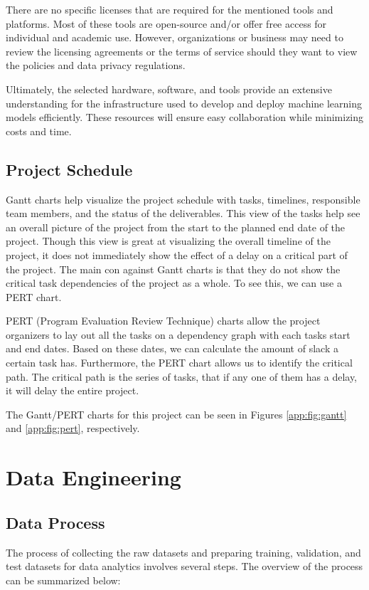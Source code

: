 \documentclass[stu,12pt,floatsintext]{apa7}
\let\oldsection\section
\renewcommand{\section}{\newpage\oldsection}
\begin{document}
There are no specific licenses that are required for the mentioned tools and platforms. Most of these tools are open-source and/or offer free access for individual and academic use. However, organizations or business may need to review the licensing agreements or the terms of service should they want to view the policies and data privacy regulations. 

Ultimately, the selected hardware, software, and tools provide an extensive understanding for the infrastructure used to develop and deploy machine learning models efficiently. These resources will ensure easy collaboration while minimizing costs and time. 

\subsection{Project Schedule}
Gantt charts help visualize the project schedule with tasks, timelines, responsible team members, and the status of the deliverables. This view of the tasks help see an overall picture of the project from the start to the planned end date of the project. Though this view is great at visualizing the overall timeline of the project, it does not immediately show the effect of a delay on a critical part of the project. The main con against Gantt charts is that they do not show the critical task dependencies of the project as a whole. To see this, we can use a PERT chart.

PERT (Program Evaluation Review Technique) charts allow the project organizers to lay out all the tasks on a dependency graph with each tasks start and end dates. Based on these dates, we can calculate the amount of slack a certain task has. Furthermore, the PERT chart allows us to identify the critical path. The critical path is the series of tasks, that if any one of them has a delay, it will delay the entire project. 

The Gantt/PERT charts for this project can be seen in Figures \ref{app:fig:gantt} and \ref{app:fig:pert}, respectively.


\section{Data Engineering}

\subsection{Data Process}
The process of collecting the raw datasets and preparing training, validation, and test datasets for data analytics involves several steps. The overview of the process can be summarized below: 
\end{document}
